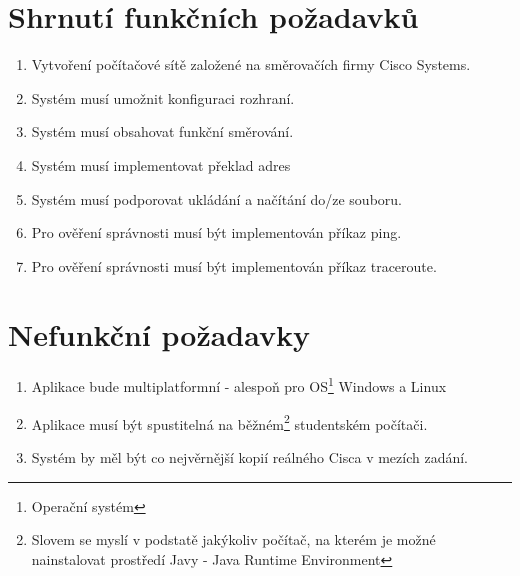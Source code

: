 \section{Shrnutí funkčních požadavků}
\begin{enumerate}
 \item Vytvoření počítačové sítě založené na směrovačích firmy Cisco Systems.
 \item Systém musí umožnit konfiguraci rozhraní.
 \item Systém musí obsahovat funkční směrování.
 \item Systém musí implementovat překlad adres
 \item Systém musí podporovat ukládání a načítání do/ze souboru.
 \item Pro ověření správnosti musí být implementován příkaz ping.
 \item Pro ověření správnosti musí být implementován příkaz traceroute.
\end{enumerate}

\section{Nefunkční požadavky}
\begin{enumerate}
 \item Aplikace bude multiplatformní - alespoň pro OS\footnote{Operační systém} Windows a Linux
 \item Aplikace musí být spustitelná na běžném\footnote{Slovem  se myslí v podstatě jakýkoliv počítač, na kterém je možné nainstalovat prostředí Javy - Java Runtime Environment} studentském počítači.
 \item Systém by měl být co nejvěrnější kopií reálného Cisca v mezích zadání.
\end{enumerate}


